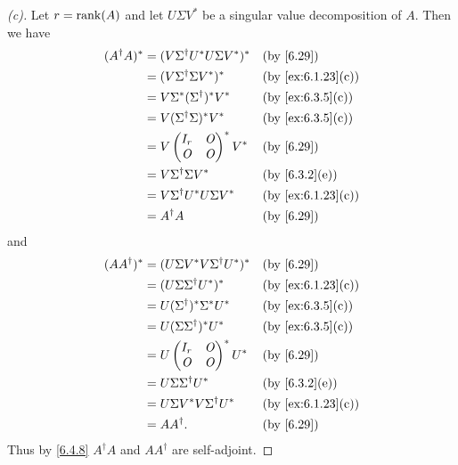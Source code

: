 \begin{proof}[(c)]
  Let \(r = \rk{A}\) and let \(U \Sigma V^*\) be a singular value decomposition of \(A\).
  Then we have
  \begin{align*}
    (A^{\dag} A)^* & = (V \Sigma^{\dag} U^* U \Sigma V^*)^* &  & \by{6.29}         \\
                   & = (V \Sigma^{\dag} \Sigma V^*)^*       &  & \by{ex:6.1.23}[c] \\
                   & = V \Sigma^* (\Sigma^{\dag})^* V^*     &  & \by{ex:6.3.5}[c]  \\
                   & = V (\Sigma^{\dag} \Sigma)^* V^*       &  & \by{ex:6.3.5}[c]  \\
                   & = V \begin{pmatrix}
                           I_r & \zm \\
                           \zm & \zm
                         \end{pmatrix}^* V^*                    &  & \by{6.29}     \\
                   & = V \Sigma^{\dag} \Sigma V^*           &  & \by{6.3.2}[e]     \\
                   & = V \Sigma^{\dag} U^* U \Sigma V^*     &  & \by{ex:6.1.23}[c] \\
                   & = A^{\dag} A                           &  & \by{6.29}
  \end{align*}
  and
  \begin{align*}
    (A A^{\dag})^* & = (U \Sigma V^* V \Sigma^{\dag} U^*)^* &  & \by{6.29}         \\
                   & = (U \Sigma \Sigma^{\dag} U^*)^*       &  & \by{ex:6.1.23}[c] \\
                   & = U (\Sigma^{\dag})^* \Sigma^* U^*     &  & \by{ex:6.3.5}[c]  \\
                   & = U (\Sigma \Sigma^{\dag})^* U^*       &  & \by{ex:6.3.5}[c]  \\
                   & = U \begin{pmatrix}
                           I_r & \zm \\
                           \zm & \zm
                         \end{pmatrix}^* U^*                    &  & \by{6.29}     \\
                   & = U \Sigma \Sigma^{\dag} U^*           &  & \by{6.3.2}[e]     \\
                   & = U \Sigma V^* V \Sigma^{\dag} U^*     &  & \by{ex:6.1.23}[c] \\
                   & = A A^{\dag}.                          &  & \by{6.29}
  \end{align*}
  Thus by \cref{6.4.8} \(A^{\dag} A\) and \(A A^{\dag}\) are self-adjoint.
\end{proof}


